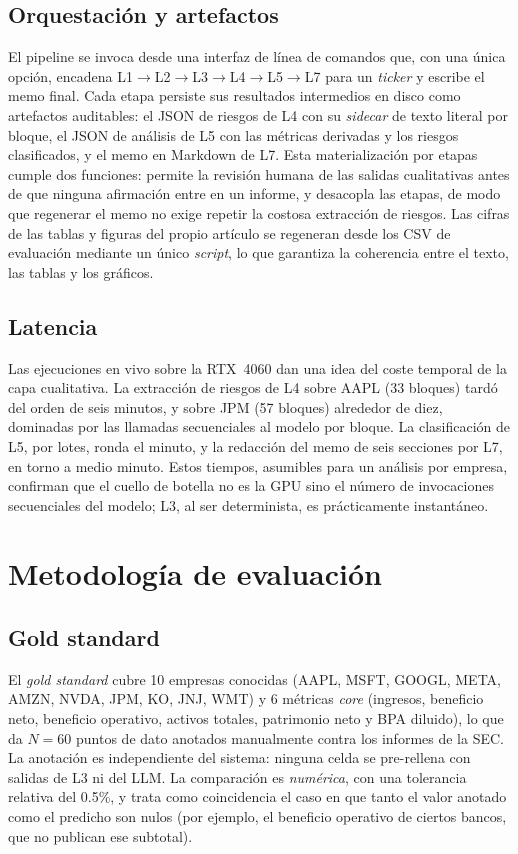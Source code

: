 \documentclass[conference]{IEEEtran}
\begin{document}
\subsection{Orquestación y artefactos}
El pipeline se invoca desde una interfaz de línea de comandos que, con una única
opción, encadena L1$\rightarrow$L2$\rightarrow$L3$\rightarrow$L4$\rightarrow$L5$\rightarrow$L7
para un \textit{ticker} y escribe el memo final. Cada etapa persiste sus
resultados intermedios en disco como artefactos auditables: el JSON de riesgos de
L4 con su \textit{sidecar} de texto literal por bloque, el JSON de análisis de L5
con las métricas derivadas y los riesgos clasificados, y el memo en Markdown de
L7. Esta materialización por etapas cumple dos funciones: permite la revisión
humana de las salidas cualitativas antes de que ninguna afirmación entre en un
informe, y desacopla las etapas, de modo que regenerar el memo no exige repetir la
costosa extracción de riesgos. Las cifras de las tablas y figuras del propio
artículo se regeneran desde los CSV de evaluación mediante un único \textit{script},
lo que garantiza la coherencia entre el texto, las tablas y los gráficos.

\subsection{Latencia}
Las ejecuciones en vivo sobre la RTX~4060 dan una idea del coste temporal de la
capa cualitativa. La extracción de riesgos de L4 sobre AAPL (33 bloques) tardó del
orden de seis minutos, y sobre JPM (57 bloques) alrededor de diez, dominadas por
las llamadas secuenciales al modelo por bloque. La clasificación de L5, por lotes,
ronda el minuto, y la redacción del memo de seis secciones por L7, en torno a
medio minuto. Estos tiempos, asumibles para un análisis por empresa, confirman que
el cuello de botella no es la GPU sino el número de invocaciones secuenciales del
modelo; L3, al ser determinista, es prácticamente instantáneo.

\section{Metodología de evaluación}
\label{sec:experiments}
\subsection{Gold standard}
El \textit{gold standard} cubre 10 empresas conocidas (AAPL, MSFT, GOOGL, META,
AMZN, NVDA, JPM, KO, JNJ, WMT) y 6 métricas \textit{core} (ingresos, beneficio
neto, beneficio operativo, activos totales, patrimonio neto y BPA diluido), lo
que da $N=60$ puntos de dato anotados manualmente contra los informes de la SEC.
La anotación es independiente del sistema: ninguna celda se pre-rellena con
salidas de L3 ni del LLM. La comparación es \emph{numérica}, con una tolerancia
relativa del 0.5\%, y trata como coincidencia el caso en que tanto el valor
anotado como el predicho son nulos (por ejemplo, el beneficio operativo de
ciertos bancos, que no publican ese subtotal).
\end{document}
